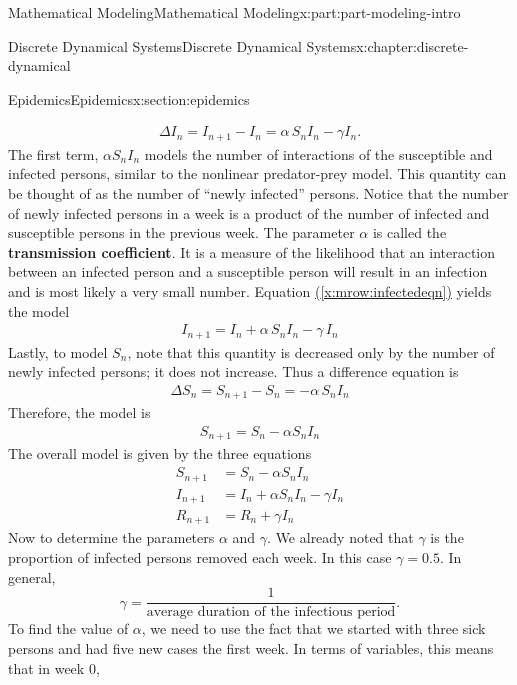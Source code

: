 \documentclass[oneside,10pt,]{book}
\newcommand{\xreffont}{\relax}
\newcommand{\terminology}[1]{\textbf{#1}}
\numberwithin{equation}{section}
\newcommand{\amp}{&}
\begin{document}
\begin{partptx}{Mathematical Modeling}{}{Mathematical Modeling}{}{}{x:part:part-modeling-intro}
\begin{chapterptx}{Discrete Dynamical Systems}{}{Discrete Dynamical Systems}{}{}{x:chapter:discrete-dynamical}
\begin{sectionptx}{Epidemics}{}{Epidemics}{}{}{x:section:epidemics}
\begin{introduction}{}
%
\begin{gather}
\Delta I_n = I_{n+1} - I_n = \alpha\,S_n I_n - \gamma I_n.\label{x:mrow:infectedeqn}
\end{gather}
The first term, \(\alpha S_n I_n\) models the number of interactions of the susceptible and infected persons, similar to the nonlinear predator-prey model. This quantity can be thought of as the number of ``newly infected'' persons.  Notice that the number of newly infected persons in a week is a product of the number of infected and susceptible persons in the previous week.  The parameter \(\alpha\) is called the \terminology{transmission coefficient}. It is a measure of the likelihood that an interaction between an infected person and a susceptible person will result in an infection and is most likely a very small number.  Equation \hyperref[x:mrow:infectedeqn]{({\xreffont\ref{x:mrow:infectedeqn}})} yields the model%
%
\begin{gather}
I_{n+1} = I_n + \alpha\,S_n I_n - \gamma\,I_n\label{x:mrow:infectedeqn2}
\end{gather}
Lastly, to model \(S_n\), note that this quantity is decreased only by the number of newly infected persons; it does not increase.  Thus a difference equation is%
%
\begin{gather}
\Delta S_n = S_{n+1} - S_n = -\alpha\,S_n I_n\label{x:mrow:susceptibleeqn}
\end{gather}
Therefore, the model is%
%
\begin{gather}
S_{n+1} = S_n - \alpha S_n I_n\label{x:mrow:susceptibleeqn2}
\end{gather}
The overall model is given by the three equations%
%
\begin{equation*}
\begin{aligned}
S_{n+1} \amp = S_n -\alpha S_n I_n \\
I_{n+1} \amp= I_n +\alpha S_n I_n - \gamma I_n \\
R_{n+1} \amp= R_n + \gamma I_n
\end{aligned}
\end{equation*}
Now to determine the parameters \(\alpha\) and \(\gamma\).  We already noted that \(\gamma\) is the proportion of infected persons removed each week. In this case \(\gamma = 0.5\).  In general,%
%
\begin{equation*}
\gamma = \frac{1}{\text{average duration of the infectious period}}.
\end{equation*}
To find the value of \(\alpha\), we need to use the fact that we started with three sick persons and had five new cases the first week.  In terms of variables, this means that in week 0,%

\end{introduction}
\end{sectionptx}
\end{chapterptx}
\end{partptx}
\end{document}
